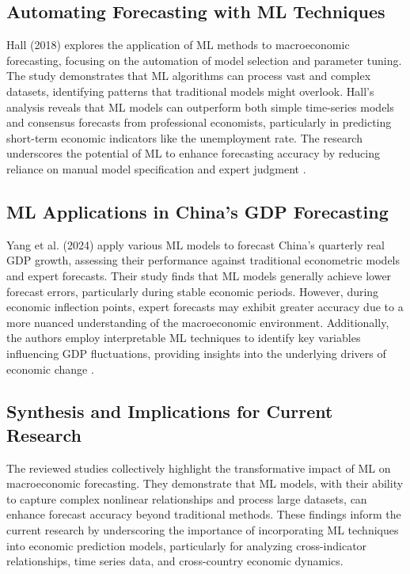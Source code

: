 \documentclass[12pt]{article}
\begin{document}
\subsection{Automating Forecasting with ML Techniques}

Hall (2018) explores the application of ML methods to macroeconomic forecasting, focusing on the automation of model selection and parameter tuning. The study demonstrates that ML algorithms can process vast and complex datasets, identifying patterns that traditional models might overlook. Hall's analysis reveals that ML models can outperform both simple time-series models and consensus forecasts from professional economists, particularly in predicting short-term economic indicators like the unemployment rate. The research underscores the potential of ML to enhance forecasting accuracy by reducing reliance on manual model specification and expert judgment \cite{Hall2018}.

\subsection{ML Applications in China's GDP Forecasting}

Yang et al. (2024) apply various ML models to forecast China's quarterly real GDP growth, assessing their performance against traditional econometric models and expert forecasts. Their study finds that ML models generally achieve lower forecast errors, particularly during stable economic periods. However, during economic inflection points, expert forecasts may exhibit greater accuracy due to a more nuanced understanding of the macroeconomic environment. Additionally, the authors employ interpretable ML techniques to identify key variables influencing GDP fluctuations, providing insights into the underlying drivers of economic change \cite{Yang2024}.

\subsection{Synthesis and Implications for Current Research}

The reviewed studies collectively highlight the transformative impact of ML on macroeconomic forecasting. They demonstrate that ML models, with their ability to capture complex nonlinear relationships and process large datasets, can enhance forecast accuracy beyond traditional methods. These findings inform the current research by underscoring the importance of incorporating ML techniques into economic prediction models, particularly for analyzing cross-indicator relationships, time series data, and cross-country economic dynamics.
\end{document}
